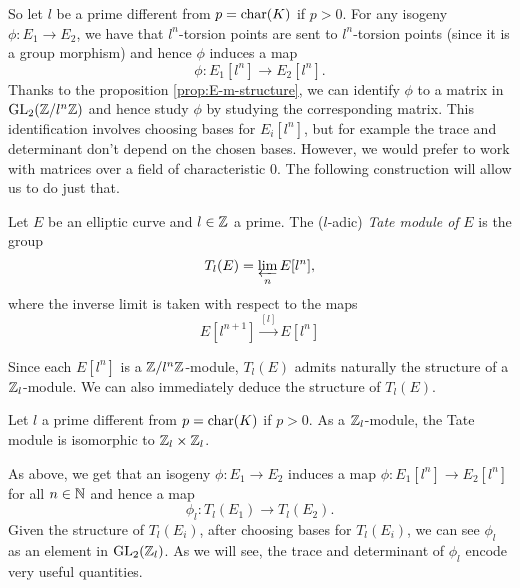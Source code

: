 So let $l$ be a prime different from $p = \operatorname{char}(K)$ if $p > 0$.
For any isogeny
$\phi: E_1 \to E_2$, we have that $l^n$-torsion points are sent to
$l^n$-torsion points (since it is a group morphism)
and hence $\phi$ induces a map
\begin{equation*}
	\phi: E_1[l^n]\to E_2[l^n].
\end{equation*}
Thanks to the proposition \ref{prop:E-m-structure}, we can identify
$\phi$ to a matrix in $\operatorname{GL}_2(\mathbb{Z}/l^n\mathbb{Z})$ and hence study $\phi$ by studying
the corresponding matrix. This identification involves choosing bases
for $E_i[l^n]$,
but for example the trace and determinant don't depend on the chosen bases.
However, we would prefer to work with matrices over a field of characteristic
0. The following construction will allow us to do just that.


\begin{definition}
	Let $E$ be an elliptic curve and $l \in \mathbb{Z}$ a prime.
	The ($l$-adic) \emph{Tate module of} $E$ is the group
	\begin{equation*}
		T_l(E) = \varprojlim_n E[l^n],
	\end{equation*}
	where the inverse limit is taken with respect to the maps
	\begin{equation*}
		E[l^{n+1}]\xrightarrow{[l]} E[l^n]
	\end{equation*}
\end{definition}

Since each $E[l^n]$ is a $\mathbb{Z}/l^n\mathbb{Z}$-module, $T_l(E)$ admits naturally the
structure of a $\mathbb{Z}_l$-module. We can also immediately deduce the structure of
$T_l(E)$.


\begin{proposition}
	Let $l$ a prime different from $p = \operatorname{char}(K)$ if $p > 0$.
	As a $\mathbb{Z}_l$-module, the Tate module is isomorphic to $\mathbb{Z}_l \times \mathbb{Z}_l$.
\end{proposition}

As above, we get that an isogeny $\phi: E_1 \to E_2$ induces a map
$\phi: E_1[l^n] \to E_2[l^n]$ for all $n \in \mathbb{N}$ and hence a map
\begin{equation*}
	\phi_l: T_l(E_1) \to T_l(E_2).
\end{equation*}
Given the structure of $T_l(E_i)$, after choosing bases for
$T_l(E_i)$, we can see $\phi_l$ as an element in
$\operatorname{GL}_2(\mathbb{Z}_l)$.
As we will see, the trace and determinant of $\phi_l$ encode
very useful quantities. 

